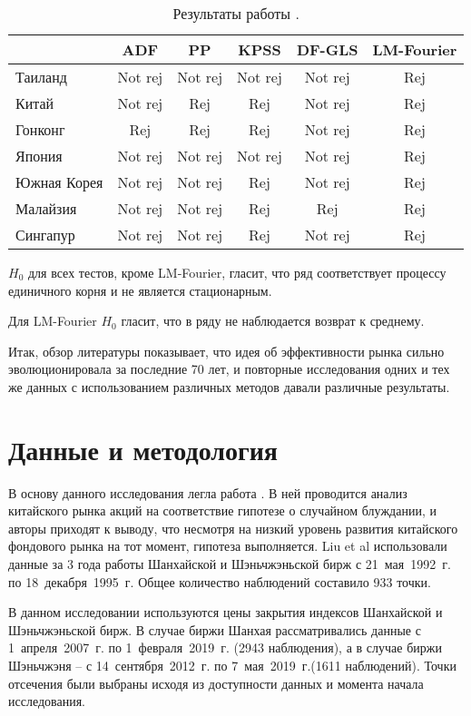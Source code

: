 \documentclass[a4paper,12pt]{article}
\begin{document}
\begin{table}
\centering
\caption{Результаты работы \cite{Wang2015}.}
\label{tab:wang}
\begin{tabular}{|l|c|c|c|c|c|}
\hline
 & ADF & PP & KPSS & DF-GLS & LM-Fourier \\ \hline
Таиланд & Not rej & Not rej & Not rej & Not rej & Rej \\ \hline
Китай & Not rej & Rej & Rej & Not rej & Rej \\ \hline
Гонконг & Rej & Rej & Rej & Not rej & Rej \\ \hline
Япония & Not rej & Not rej & Not rej & Not rej & Rej \\ \hline
Южная Корея & Not rej & Not rej & Rej & Not rej & Rej \\ \hline
Малайзия & Not rej & Not rej & Rej & Rej & Rej \\ \hline
Сингапур & Not rej & Not rej & Rej & Not rej & Rej \\ \hline
\end{tabular}

{\raggedright \par $H_0$ для всех тестов, кроме LM-Fourier, гласит, что ряд соответствует процессу единичного корня и не является стационарным.}

{\raggedright \par Для LM-Fourier $H_0$ гласит, что в ряду не наблюдается возврат к среднему.}
\end{table}

Итак, обзор литературы показывает, что идея об эффективности рынка сильно эволюционировала за последние 70 лет, и повторные исследования одних и тех же данных с использованием различных методов давали различные результаты.

\newpage
\section{Данные и методология}\label{sec:meth}

В основу данного исследования легла работа \cite{Liu1997}. В ней проводится анализ китайского рынка акций на соответствие гипотезе о случайном блуждании, и авторы приходят к выводу, что несмотря на низкий уровень развития китайского фондового рынка на тот момент, гипотеза выполняется. Liu et al использовали данные за 3 года работы Шанхайской и Шэньчжэньской бирж с 21~мая~1992~г. по 18~декабря~1995~г. Общее количество наблюдений составило 933 точки.

В данном исследовании используются цены закрытия индексов Шанхайской и Шэньчжэньской бирж. В случае биржи Шанхая рассматривались данные с 1~апреля~2007~г. по 1~февраля~2019~г. (2943 наблюдения), а в случае биржи Шэньчжэня -- с 14~сентября~2012~г. по 7~мая~2019~г.(1611 наблюдений). Точки отсечения были выбраны исходя из доступности данных и момента начала исследования.
\end{document}
